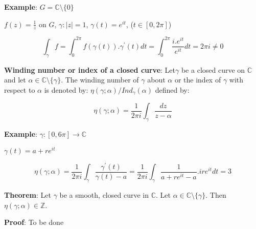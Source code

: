 \documentclass{article}
\begin{document}
\begin{flushleft}
\textbf{Example}: $G=\mathds{C}\setminus \{0\}$

$f(z)=\frac{1}{z}$ on $G$, $\gamma: |z|=1$, $\gamma(t)=e^{it}$, ($t\in [0,2\pi]$)

$$\int_{\gamma}^{} f= \int_{0}^{2\pi} f(\gamma(t)).\gamma^{'}(t) dt= \int_{0}^{2\pi} \frac{i.e^{it}}{e^{it}} dt =2\pi i\neq 0$$

\textbf{Winding number or index of a closed curve}:
Let$\gamma$ be a closed curve on $\mathds{C}$ and let $\alpha \in \mathds{C}\setminus \{\gamma\}$. The winding number of $\gamma$ about $\alpha$ or the index of $\gamma$ with respect to $\alpha$ is denoted by:
$\eta(\gamma;\alpha)/Ind_{\gamma}(\alpha)$ defined by:

$$\eta(\gamma;\alpha)=\frac{1}{2\pi i}\int_{\gamma}^{}\frac{dz}{z-\alpha}$$

\textbf{Example}: $\gamma: [0,6\pi]\rightarrow \mathds{C}$ 

$\gamma(t)=a+re^{it}$ 

$$\eta(\gamma;\alpha)=\frac{1}{2\pi i}\int_{\gamma}^{} \frac{\gamma^{'}(t)}{\gamma(t)-a}=\frac{1}{2\pi i}\int_{\gamma}^{} \frac{1}{a+re^{it}-a}.ire^{it} dt=3$$

\textbf{Theorem}: Let $\gamma$ be a smooth, closed curve in $\mathds{C}$. Let $\alpha\in \mathds{C}\setminus \{\gamma\}$. Then $\eta(\gamma;\alpha)\in \mathds{Z}$.

\textbf{Proof}: To be done


\end{flushleft}
\end{document}
